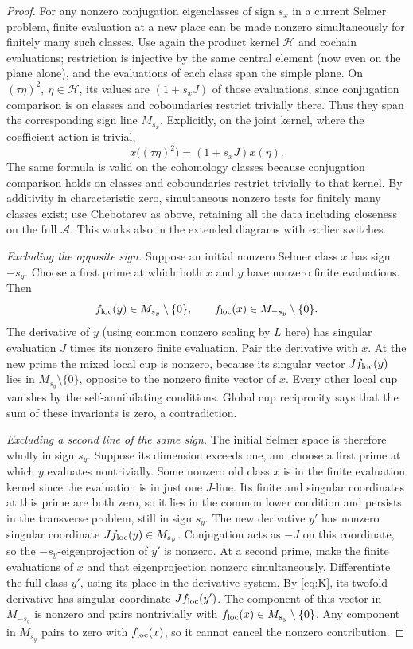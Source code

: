 \begin{proof}
For any nonzero conjugation eigenclasses of sign \(s_x\) in a current Selmer problem, finite evaluation at a new place can be made nonzero simultaneously for finitely many such classes. Use again the product kernel \(\mathcal H\) and cochain evaluations; restriction is injective by the same central element (now even on the plane alone), and the evaluations of each class span the simple plane. On \((\tau\eta)^2,\ \eta\in\mathcal H\), its values are \((1+s_x J)\) of those evaluations, since conjugation comparison is on classes and coboundaries restrict trivially there. Thus they span the corresponding sign line \(M_{s_x}\). Explicitly, on the joint kernel, where the coefficient action is trivial,
\[
 x\big((\tau\eta)^2\big)=(1+s_xJ)x(\eta).
\]
The same formula is valid on the cohomology classes because conjugation comparison holds on classes and coboundaries restrict trivially to that kernel. By additivity in characteristic zero, simultaneous nonzero tests for finitely many classes exist; use Chebotarev as above, retaining all the data including closeness on the full \(\mathcal A\). This works also in the extended diagrams with earlier switches.

\smallskip\noindent\emph{Excluding the opposite sign.}
Suppose an initial nonzero Selmer class \(x\) has sign \(-s_y\). Choose a first prime at which both \(x\) and \(y\) have nonzero finite evaluations. Then
\[
 f_{\rm loc}(y)\in M_{s_y}\setminus\{0\},\qquad
 f_{\rm loc}(x)\in M_{-s_y}\setminus\{0\}.
\]
The derivative of \(y\) (using common nonzero scaling by \(L\) here) has singular evaluation \(J\) times its nonzero finite evaluation. Pair the derivative with \(x\). At the new prime the mixed local cup is nonzero, because its singular vector \(Jf_{\rm loc}(y)\) lies in \(M_{s_y}\setminus\{0\}\), opposite to the nonzero finite vector of \(x\). Every other local cup vanishes by the self-annihilating conditions. Global cup reciprocity says that the sum of these invariants is zero, a contradiction.

\smallskip\noindent\emph{Excluding a second line of the same sign.}
The initial Selmer space is therefore wholly in sign \(s_y\). Suppose its dimension exceeds one, and choose a first prime at which \(y\) evaluates nontrivially. Some nonzero old class \(x\) is in the finite evaluation kernel since the evaluation is in just one \(J\)-line. Its finite and singular coordinates at this prime are both zero, so it lies in the common lower condition and persists in the transverse problem, still in sign \(s_y\). The new derivative \(y'\) has nonzero singular coordinate \(Jf_{\rm loc}(y)\in M_{s_y}\). Conjugation acts as \(-J\) on this coordinate, so the \(-s_y\)-eigenprojection of \(y'\) is nonzero. At a second prime, make the finite evaluations of \(x\) and that eigenprojection nonzero simultaneously. Differentiate the full class \(y'\), using its place in the derivative system. By \eqref{eq:K}, its twofold derivative has singular coordinate \(Jf_{\rm loc}(y')\). The component of this vector in \(M_{-s_y}\) is nonzero and pairs nontrivially with \(f_{\rm loc}(x)\in M_{s_y}\setminus\{0\}\). Any component in \(M_{s_y}\) pairs to zero with \(f_{\rm loc}(x)\), so it cannot cancel the nonzero contribution.


\end{proof}
